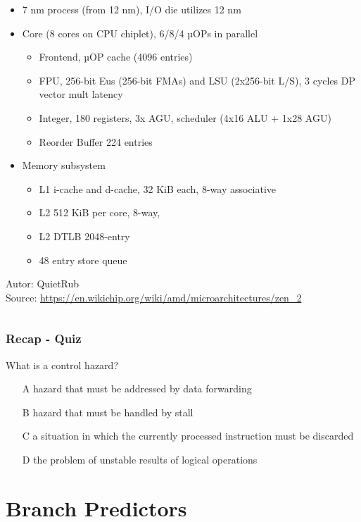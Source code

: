 \documentclass{beamer}
\begin{document}
\begin{frame}
\begin{columns}[T]
\begin{column}{0.66\textwidth}
\scriptsize
\begin{itemize}
\item 7 nm process (from 12 nm), I/O die utilizes 12 nm
\item Core (8 cores on CPU chiplet), 6/8/4 µOPs in parallel
\begin{itemize}
\scriptsize
\item Frontend, µOP cache (4096 entries)
\item FPU, 256-bit Eus (256-bit FMAs) and LSU (2x256-bit L/S), 3 cycles DP vector mult latency
\item Integer, 180 registers, 3x AGU, scheduler (4x16 ALU + 1x28 AGU)
\item Reorder Buffer 224 entries
\end{itemize}
\item Memory subsystem
\begin{itemize}
\scriptsize
\item L1 i-cache and d-cache, 32 KiB each, 8-way associative
\item L2 512 KiB per core, 8-way,
\item L2 DTLB 2048-entry
\item 48 entry store queue
\end{itemize}
\end{itemize}
Autor: QuietRub\\
Source: \url{https://en.wikichip.org/wiki/amd/microarchitectures/zen_2}
\end{column}
\end{columns}

\end{frame}


\begin{frame}
\frametitle{Recap - Quiz}

What is a control hazard?

\bigskip
\begin{itemize}
 \item[A] hazard that must be addressed by data forwarding
 \item[B] hazard that must be handled by stall
 \item[C] a situation in which the currently processed instruction must be discarded
 \item[D] the problem of unstable results of logical operations
\end{itemize}
\end{frame}

\section{Branch Predictors}
\end{document}
